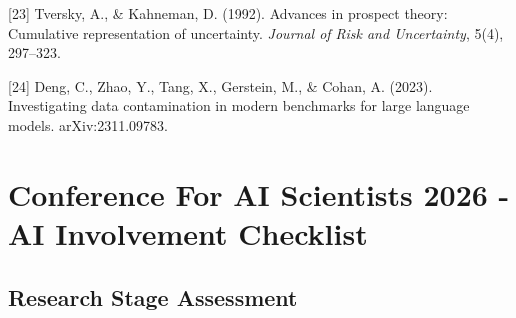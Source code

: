 \documentclass{article}
\begin{document}
[23] Tversky, A., \& Kahneman, D. (1992). Advances in prospect theory:
Cumulative representation of uncertainty. \textit{Journal of Risk and
Uncertainty}, 5(4), 297--323.

[24] Deng, C., Zhao, Y., Tang, X., Gerstein, M., \& Cohan, A. (2023). Investigating
data contamination in modern benchmarks for large language models. arXiv:2311.09783.

\newpage

\section*{Conference For AI Scientists 2026 - AI Involvement Checklist}
\label{checklist_ai_involvement}

\subsection*{Research Stage Assessment}
\end{document}

